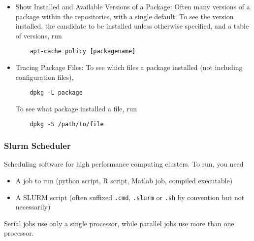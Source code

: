 \documentclass[12pt]{article}
\theoremstyle{plain}
\theoremstyle{definition}
\theoremstyle{remark}
\begin{document}
\begin{itemize}
  \item Show Installed and Available Versions of a Package:
    Often many versions of a package within the repositories, with a
    single default.
    To see the version installed, the candidate to be installed unless
    otherwise specified, and a table of versions, run
    \begin{lstlisting}
    apt-cache policy [packagename]
    \end{lstlisting}


  \item Tracing Package Files:
    To see which files a package installed (not including configuration
    files),
    \begin{lstlisting}
    dpkg -L package
    \end{lstlisting}
    To see what package installed a file, run
    \begin{lstlisting}
    dpkg -S /path/to/file
    \end{lstlisting}

\end{itemize}


\clearpage
\subsubsection{Slurm Scheduler}

Scheduling software for high performance computing clusters.
To run, you need
\begin{itemize}
  \item A job to run (python script, R script, Matlab job, compiled
    executable)
  \item
    A SLURM script (often suffixed \texttt{.cmd}, \texttt{.slurm} or
    \texttt{.sh} by convention but not necessarily)
\end{itemize}
Serial jobs use only a single processor, while parallel jobs use more
than one processor.
\end{document}
